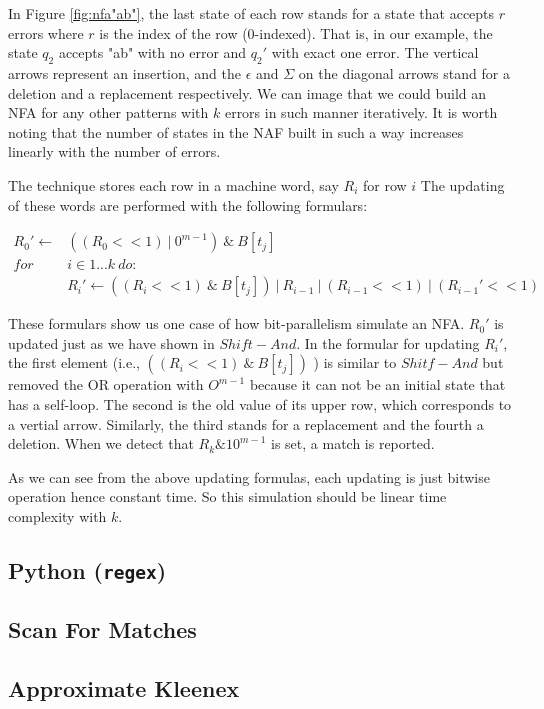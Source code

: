 In Figure \ref{fig:nfa"ab"}, the last state of each row stands for a state that accepts $r$ errors where $r$ is the index of the row (0-indexed). That is, in our example, the state $q_2$ accepts "ab" with no error and $q_2'$  with exact one error. The vertical arrows represent an insertion, and the $\epsilon$ and $\Sigma$ on the diagonal arrows stand for a deletion and a replacement respectively. We can image that we could build an NFA for any other patterns with $k$ errors in such manner iteratively. It is worth noting that the number of states in the NAF built in such a way increases linearly with the number of errors.

The technique stores each row in a machine word, say $R_i$ for row $i$ %
The updating of these words are performed with the following formulars: 

\begin{align*}
R_0' \leftarrow & ((R_0 << 1) \ |\ 0^{m-1}) \ \& \ B[t_j] \\
for \ &i \in 1...k \ do:  \\
	& R_i' \leftarrow ((R_i << 1) \ \& \ B[t_j] ) \ |\ R_{i-1} \ | \ (R_{i-1} << 1 ) \ |\ (R_{i-1}' << 1)
\end{align*}

These formulars show us one case of how bit-parallelism simulate an NFA. $R_0'$ is updated just as we have shown in $Shift-And$. In the formular for updating $R_i'$, the first element (i.e., $((R_i << 1) \ \& \ B[t_j] ) $ ) is similar to $Shitf-And$ but removed the OR operation with $O^{m-1}$ because it can not be an initial state that has a self-loop. The second is the old value of its upper row, which corresponds to a vertial arrow. Similarly, the third stands for a replacement and the fourth a deletion. When we detect that $R_k \& 10^{m-1}$ is set, a match is reported.  

As we can see from the above updating formulas, each updating is just bitwise operation hence constant time. So this simulation should be linear time complexity with $k$.
 
\subsection{Python (\texttt{regex})}

\subsection{Scan For Matches}


\subsection{Approximate Kleenex}
